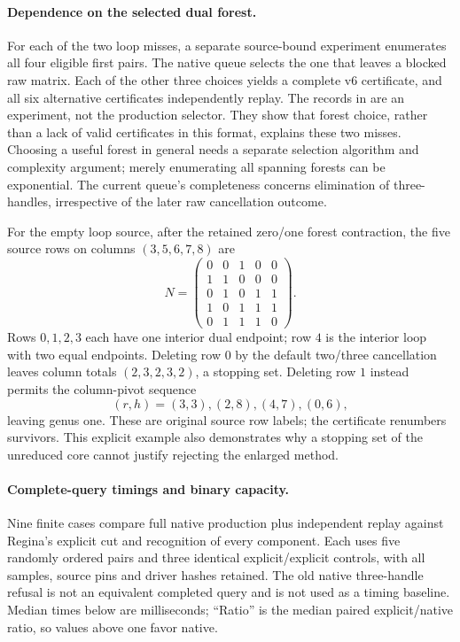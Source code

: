 \paragraph{Dependence on the selected dual forest.}
For each of the two loop misses, a separate source-bound experiment enumerates
all four eligible first pairs. The native queue selects the one that leaves
a blocked raw matrix. Each of the other three choices yields a complete v6
certificate, and all six alternative certificates independently replay.
The records in  are an experiment,
not the production selector. They show that forest choice, rather than a
lack of valid certificates in this format, explains these two misses.
Choosing a useful forest in general needs a separate selection algorithm
and complexity argument; merely enumerating all spanning forests can be
exponential. The current queue's completeness concerns elimination of
three-handles, irrespective of the later raw cancellation outcome.


For the empty loop source, after the retained zero/one forest contraction,
the five source rows on columns $(3,5,6,7,8)$ are
\[
 N=\begin{pmatrix}
 0&0&1&0&0\\
 1&1&0&0&0\\
 0&1&0&1&1\\
 1&0&1&1&1\\
 0&1&1&1&0
 \end{pmatrix}.
\]
Rows $0,1,2,3$ each have one interior dual endpoint; row $4$ is the
interior loop with two equal endpoints. Deleting row $0$ by the default
two/three cancellation leaves column totals $(2,3,2,3,2)$, a stopping set.
Deleting row $1$ instead permits the column-pivot sequence
\[
 (r,h)=(3,3),(2,8),(4,7),(0,6),
\]
leaving genus one.
These are original source row labels; the certificate renumbers survivors.
This explicit example also demonstrates why a stopping set of the
unreduced core cannot justify rejecting the enlarged method.


\paragraph{Complete-query timings and binary capacity.}
Nine finite cases compare full native production plus independent replay
against Regina's explicit cut and recognition of every component. Each uses
five randomly ordered pairs and three identical explicit/explicit controls,
with all samples, source pins and driver hashes retained. The old native
three-handle refusal is not an equivalent completed query and is not used
as a timing baseline. Median times below are milliseconds; ``Ratio'' is the
median paired explicit/native ratio, so values above one favor native.

